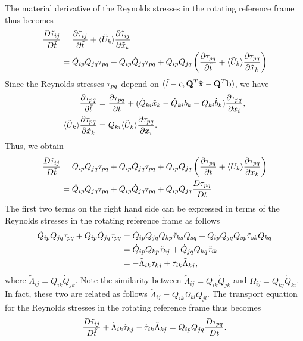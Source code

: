 \documentclass[oneside,a4paper,11pt]{report}
\begin{document}
The material derivative of the Reynolds stresses in the rotating reference frame thus becomes
\begin{align}
\frac{D \tilde{\tau}_{ij}}{D \tilde{t}} &= \frac{\partial \tilde{\tau}_{ij} }{\partial \tilde{t}} + \langle \tilde{U}_k \rangle \frac{\partial \tilde{\tau}_{ij} }{\partial \tilde{x}_k} \nonumber \\
& = \dot{Q}_{ip}Q_{jq} \tau_{pq} + Q_{ip} \dot{Q}_{jq} \tau_{pq} + Q_{ip}Q_{jq} \left ( \frac{\partial \tau_{pq} }{\partial \tilde{t}} + \langle \tilde{U}_k \rangle \frac{\partial \tau_{pq} }{\partial \tilde{x}_k} \right ) 
\end{align}
Since the Reynolds stresses $\tau_{pq}$ depend on $(\tilde{t} - c,\bold{Q}^T\tilde{\mathbf{x}} - \bold{Q}^T \mathbf{b})$, we have
\begin{align}
\frac{\partial \tau_{pq} }{\partial \tilde{t}} &=  \frac{\partial \tau_{pq} }{\partial t} + (\dot{Q}_{ki} \tilde{x}_k - \dot{Q}_{ki} b_k - Q_{ki}\dot{b}_k) \frac{\partial \tau_{pq} }{\partial x_i}, \nonumber \\
\langle \tilde{U}_k \rangle \frac{\partial \tau_{pq} }{\partial \tilde{x}_k} &= Q_{ki} \langle \tilde{U}_k \rangle \frac{\partial \tau_{pq} }{\partial x_i} .
\end{align}
Thus, we obtain
\begin{align}
\frac{D \tilde{\tau}_{ij} }{D \tilde{t}} &= \dot{Q}_{ip}Q_{jq} \tau_{pq} + Q_{ip} \dot{Q}_{jq} \tau_{pq} + Q_{ip}Q_{jq} \left ( \frac{\partial \tau_{pq} }{\partial t} + \langle U_k \rangle \frac{\partial \tau_{pq} }{\partial x_k} \right ) \nonumber \\
& = \dot{Q}_{ip}Q_{jq} \tau_{pq} + Q_{ip} \dot{Q}_{jq} \tau_{pq} + Q_{ip}Q_{jq} \frac{D \tau_{pq} }{D t} 
\end{align}
The first two terms on the right hand side can be expressed in terms of the Reynolds stresses in the rotating reference frame as follows
\begin{align}
\label{trans_eq_additional_terms}
\dot{Q}_{ip}Q_{jq} \tau_{pq} + Q_{ip} \dot{Q}_{jq} \tau_{pq} &= \dot{Q}_{ip}Q_{jq} Q_{kp} \tilde{\tau}_{ks} Q_{sq} + Q_{ip} \dot{Q}_{jq} Q_{sp} \tilde{\tau}_{sk} Q_{kq} \nonumber \\
& = \dot{Q}_{ip}Q_{kp} \tilde{\tau}_{kj} + \dot{Q}_{jq}Q_{kq} \tilde{\tau}_{ik} \nonumber \\
& = -\tilde{\Lambda}_{ik} \tilde{\tau}_{kj} + \tilde{\tau}_{ik} \tilde{\Lambda}_{kj},
\end{align}
where $\tilde{\Lambda}_{ij} = Q_{ik}\dot{Q}_{jk}$. Note the similarity between $\tilde{\Lambda}_{ij} = Q_{ik}\dot{Q}_{jk}$ and $\Omega_{ij} = Q_{kj}\dot{Q}_{ki}$. In fact, these two are related as follows $\tilde{\Lambda}_{ij} = Q_{ik}\Omega_{kl}Q_{jl}$. The transport equation for the Reynolds stresses in the rotating reference frame thus becomes
\begin{equation}
\label{reynolds_stress_transport_eq_noninertial}
\frac{D \tilde{\tau}_{ij} }{D \tilde{t}} + \tilde{\Lambda}_{ik} \tilde{\tau}_{kj} - \tilde{\tau}_{ik} \tilde{\Lambda}_{kj} = Q_{ip}Q_{jq} \frac{D \tau_{pq}}{D t} . 
\end{equation}
\end{document}
